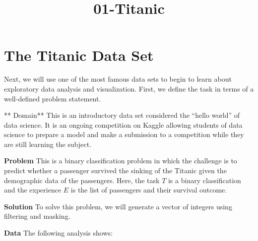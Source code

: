 \documentclass[11pt]{article}
\title{01-Titanic}
\begin{document}
    
    
    \maketitle
    
    

    
    \hypertarget{the-titanic-data-set}{%
\section{The Titanic Data Set}\label{the-titanic-data-set}}

Next, we will use one of the most famous data sets to begin to learn
about exploratory data analysis and visualization. First, we define the
task in terms of a well-defined problem statement.

    ** Domain** This is an introductory data set considered the ``hello
world'' of data science. It is an ongoing competition on Kaggle allowing
students of data science to prepare a model and make a submission to a
competition while they are still learning the subject.

\textbf{Problem} This is a binary classification problem in which the
challenge is to predict whether a passenger survived the sinking of the
Titanic given the demographic data of the passengers. Here, the task
\(T\) is a binary classification and the experience \(E\) is the list of
passengers and their survival outcome.

\textbf{Solution} To solve this problem, we will generate a vector of
integers using filtering and masking.

\textbf{Data} The following analysis shows:
\end{document}
